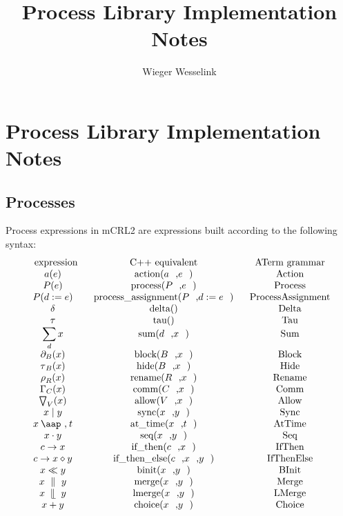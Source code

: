 \documentclass{article}
\providecommand{\at}{\mathbin{\mbox{\aap ,}}}
\providecommand{\leftmerge}{\mathbin{\mathrel{\llfloor}}}
\begin{document}
\title{Process Library Implementation Notes}
\author{Wieger Wesselink}
\maketitle

\section{Process Library Implementation Notes}

\subsection{Processes}

Process expressions in mCRL2 are expressions built according to the
following syntax:%
\[
\begin{array}{ccc}
\text{expression} & \text{C++ equivalent} & \text{ATerm grammar} \\
a(e) & \text{action(}a\text{,}e\text{)} & \text{Action} \\
P(e) & \text{process(}P\text{,}e\text{)} & \text{Process} \\
P(d:=e) & \text{process\_assignment(}P\text{,}d:=e\text{)} & \text{%
ProcessAssignment} \\
\delta & \text{delta()} & \text{Delta} \\
\tau & \text{tau()} & \text{Tau} \\
\dsum\limits_{d}x & \text{sum(}d\text{,}x\text{)} & \text{Sum} \\
\partial _{B}(x) & \text{block(}B\text{,}x\text{)} & \text{Block} \\
\tau _{B}(x) & \text{hide(}B\text{,}x\text{)} & \text{Hide} \\
\rho _{R}(x) & \text{rename(}R\text{,}x\text{)} & \text{Rename} \\
\Gamma _{C}(x) & \text{comm(}C\text{,}x\text{)} & \text{Comm} \\
\bigtriangledown _{V}(x) & \text{allow(}V\text{,}x\text{)} & \text{Allow} \\
x\mid y & \text{sync(}x\text{,}y\text{)} & \text{Sync} \\
x\at t & \text{at\_time(}x\text{,}t\text{)} & \text{AtTime} \\
x\cdot y & \text{seq(}x\text{,}y\text{)} & \text{Seq} \\
c\rightarrow x & \text{if\_then(}c\text{,}x\text{)} & \text{IfThen} \\
c\rightarrow x\diamond y & \text{if\_then\_else(}c\text{,}x\text{,}y\text{)}
& \text{IfThenElse} \\
x\ll y & \text{binit(}x\text{,}y\text{)} & \text{BInit} \\
x\ \parallel \ y & \text{merge(}x\text{,}y\text{)} & \text{Merge} \\
x\ \leftmerge \ y & \text{lmerge(}x\text{,}y\text{)} & \text{LMerge} \\
x+y & \text{choice(}x\text{,}y\text{)} & \text{Choice}%
\end{array}%
\]
\end{document}
